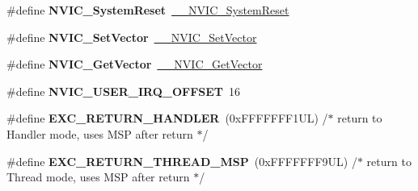 \begin{DoxyCompactItemize}
\item 
\mbox{\label{group___c_m_s_i_s___core___n_v_i_c_functions_ga6aa0367d3642575610476bf0366f0c48}} 
\#define {\bfseries N\+V\+I\+C\+\_\+\+System\+Reset}~\mbox{\hyperlink{group___c_m_s_i_s___core___n_v_i_c_functions_ga0d9aa2d30fa54b41eb780c16e35b676c}{\+\_\+\+\_\+\+N\+V\+I\+C\+\_\+\+System\+Reset}}
\item 
\mbox{\label{group___c_m_s_i_s___core___n_v_i_c_functions_ga804af63bb4c4c317387897431814775d}} 
\#define {\bfseries N\+V\+I\+C\+\_\+\+Set\+Vector}~\mbox{\hyperlink{group___c_m_s_i_s___core___n_v_i_c_functions_ga0df355460bc1783d58f9d72ee4884208}{\+\_\+\+\_\+\+N\+V\+I\+C\+\_\+\+Set\+Vector}}
\item 
\mbox{\label{group___c_m_s_i_s___core___n_v_i_c_functions_ga955eb1c33a3dcc62af11a8385e8c0fc8}} 
\#define {\bfseries N\+V\+I\+C\+\_\+\+Get\+Vector}~\mbox{\hyperlink{group___c_m_s_i_s___core___n_v_i_c_functions_ga44b665d2afb708121d9b10c76ff00ee5}{\+\_\+\+\_\+\+N\+V\+I\+C\+\_\+\+Get\+Vector}}
\item 
\mbox{\label{group___c_m_s_i_s___core___n_v_i_c_functions_ga8045d905a5ca57437d8e6f71ffcb6df5}} 
\#define {\bfseries N\+V\+I\+C\+\_\+\+U\+S\+E\+R\+\_\+\+I\+R\+Q\+\_\+\+O\+F\+F\+S\+ET}~16
\item 
\mbox{\label{group___c_m_s_i_s___core___n_v_i_c_functions_gaa6fa2b10f756385433e08522d9e4632f}} 
\#define {\bfseries E\+X\+C\+\_\+\+R\+E\+T\+U\+R\+N\+\_\+\+H\+A\+N\+D\+L\+ER}~(0x\+F\+F\+F\+F\+F\+F\+F1\+U\+L)     /$\ast$ return to Handler mode, uses M\+S\+P after return                               $\ast$/
\item 
\mbox{\label{group___c_m_s_i_s___core___n_v_i_c_functions_gaea4703101b5e679f695e231f7ee72331}} 
\#define {\bfseries E\+X\+C\+\_\+\+R\+E\+T\+U\+R\+N\+\_\+\+T\+H\+R\+E\+A\+D\+\_\+\+M\+SP}~(0x\+F\+F\+F\+F\+F\+F\+F9\+U\+L)     /$\ast$ return to Thread mode, uses M\+S\+P after return                                $\ast$/
\item 
\mbox{\label{group___c_m_s_i_s___core___n_v_i_c_functions_ga9998daf0fbdf31dbc8f81cd604b58175}} 

\end{DoxyCompactItemize}

